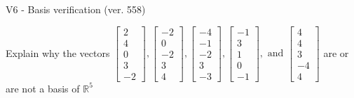 \begin{exercise}
  \begin{exerciseTitle}V6 - Basis verification (ver. 558)\end{exerciseTitle}
  \begin{exerciseStatement}
    Explain why the vectors \(\left[\begin{array}{r}
2 \\
4 \\
0 \\
3 \\
-2
\end{array}\right] , \left[\begin{array}{r}
-2 \\
0 \\
-2 \\
3 \\
4
\end{array}\right] , \left[\begin{array}{r}
-4 \\
-1 \\
-2 \\
3 \\
-3
\end{array}\right] , \left[\begin{array}{r}
-1 \\
3 \\
1 \\
0 \\
-1
\end{array}\right] , \text{ and } \left[\begin{array}{r}
4 \\
4 \\
3 \\
-4 \\
4
\end{array}\right]\) are or are not a basis of \(\mathbb{R}^5\)	



\end{exerciseStatement}
\end{exercise}
